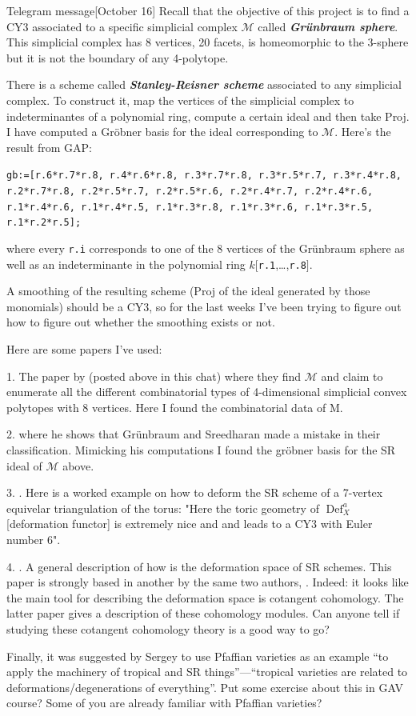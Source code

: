 \begin{thing7}{Telegram message}[October 16]\leavevmode
	Recall that the objective of this project is to find a CY3 associated to a specific simplicial complex $\mathcal{M}$ called \textit{\textbf{Grünbraum sphere}}. This simplicial complex has 8 vertices, 20 facets, is homeomorphic to the 3-sphere but it is not the boundary of any 4-polytope.

	There is a scheme called \textit{\textbf{Stanley-Reisner scheme}} associated to any simplicial complex. To construct it, map the vertices of the simplicial complex to indeterminantes of a polynomial ring, compute a certain ideal and then take Proj. I have computed a Gröbner basis for the ideal corresponding to $\mathcal{M}$. Here's the result from GAP:
 
\texttt{gb:=[r.6*r.7*r.8, r.4*r.6*r.8, r.3*r.7*r.8, r.3*r.5*r.7, r.3*r.4*r.8, r.2*r.7*r.8, r.2*r.5*r.7, r.2*r.5*r.6, 
r.2*r.4*r.7, r.2*r.4*r.6, r.1*r.4*r.6, r.1*r.4*r.5, r.1*r.3*r.8, r.1*r.3*r.6, r.1*r.3*r.5, r.1*r.2*r.5];}

where every \texttt{r.i}  corresponds to one of the 8 vertices of the Grünbraum sphere as well as an indeterminante in the polynomial ring $k[$\texttt{r.1},…,\texttt{r.8}$]$.

 A smoothing of the resulting scheme (Proj of the ideal generated by those monomials) should be a CY3, so for the last weeks I've been trying to figure out how to figure out whether the smoothing exists or not.

 Here are some papers I’ve used:

 1. The paper by \cite{grun} (posted above in this chat) where they find $\mathcal{M}$ and claim to enumerate all the different combinatorial types of 4-dimensional simplicial convex polytopes with 8 vertices. Here I found the combinatorial data of M.

 2. \cite{luk1} where he shows that Grünbraum and Sreedharan made a mistake in their classification. Mimicking his computations I found the gröbner basis for the SR ideal of $\mathcal{M}$ above.

 3. \cite{jan1}. Here is a worked example on how to deform the SR scheme of a 7-vertex equivelar triangulation of the torus: "Here the toric geometry of $\operatorname{Def}^a_{X}$ [deformation functor] is extremely nice and and leads to a CY3 with Euler number 6".

 4. \cite{jan2}. A general description of how is the deformation space of SR schemes. This paper is strongly based in another by the same two authors, \cite{jan3}. Indeed: it looks like the main tool for describing the deformation space is cotangent cohomology. The latter paper gives a description of these cohomology modules. Can anyone tell if studying these cotangent cohomology theory is a good way to go?


 Finally, it was suggested by Sergey to use Pfaffian varieties as an example “to apply the machinery of tropical and SR things”—“tropical varieties are related to deformations/degenerations of everything”. Put some exercise about this in GAV course? Some of you are already familiar with Pfaffian varieties?
\end{thing7}

